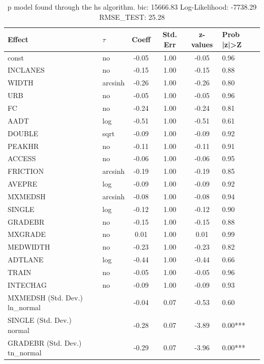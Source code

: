 \begin{table}
	\caption{p model found through the hs algorithm. bic: 15666.83 Log-Likelihood: -7738.29 RMSE_TEST: 25.28}
	\begin{center}
		\begin{tabular}{|l|l|c|c|c|l|}
			\hline
			Effect & $\tau$ & Coeff & Std. Err & z-values & Prob |z|>Z \\
			\hline
			const & no & -0.05 & 1.00 & -0.05 & 0.96 \\
			\hline
			INCLANES & no & -0.15 & 1.00 & -0.15 & 0.88 \\
			\hline
			WIDTH & arcsinh & -0.26 & 1.00 & -0.26 & 0.80 \\
			\hline
			URB & no & -0.05 & 1.00 & -0.05 & 0.96 \\
			\hline
			FC & no & -0.24 & 1.00 & -0.24 & 0.81 \\
			\hline
			AADT & log & -0.51 & 1.00 & -0.51 & 0.61 \\
			\hline
			DOUBLE & sqrt & -0.09 & 1.00 & -0.09 & 0.92 \\
			\hline
			PEAKHR & no & -0.11 & 1.00 & -0.11 & 0.91 \\
			\hline
			ACCESS & no & -0.06 & 1.00 & -0.06 & 0.95 \\
			\hline
			FRICTION & arcsinh & -0.19 & 1.00 & -0.19 & 0.85 \\
			\hline
			AVEPRE & log & -0.09 & 1.00 & -0.09 & 0.92 \\
			\hline
			MXMEDSH & arcsinh & -0.08 & 1.00 & -0.08 & 0.94 \\
			\hline
			SINGLE & log & -0.12 & 1.00 & -0.12 & 0.90 \\
			\hline
			GRADEBR & no & -0.15 & 1.00 & -0.15 & 0.88 \\
			\hline
			MXGRADE & no & 0.01 & 1.00 & 0.01 & 0.99 \\
			\hline
			MEDWIDTH & no & -0.23 & 1.00 & -0.23 & 0.82 \\
			\hline
			ADTLANE & log & -0.44 & 1.00 & -0.44 & 0.66 \\
			\hline
			TRAIN & no & -0.05 & 1.00 & -0.05 & 0.96 \\
			\hline
			INTECHAG & no & -0.09 & 1.00 & -0.09 & 0.93 \\
			\hline
			MXMEDSH (Std. Dev.) ln_normal &  & -0.04 & 0.07 & -0.53 & 0.60 \\
			\hline
			SINGLE (Std. Dev.) normal &  & -0.28 & 0.07 & -3.89 & 0.00*** \\
			\hline
			GRADEBR (Std. Dev.) tn_normal &  & -0.29 & 0.07 & -3.96 & 0.00*** \\

\end{tabular}
\end{center}
\end{table}
